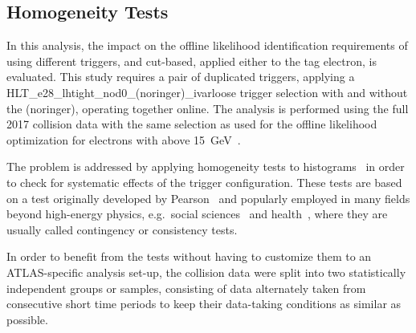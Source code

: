 \FloatBarrier
\subsection[Homogeneity Tests]{Homogeneity Tests}\label{ssec:agreement}

In this analysis, the impact on the offline likelihood identification requirements of using different triggers, \rnn{} and cut-based, applied either to the tag electron, is evaluated. 
This study requires a pair of duplicated triggers, applying a HLT\_e28\_lhtight\_nod0\_(noringer)\_ivarloose trigger selection with and without the \rnn{} (noringer), operating together online. The analysis is performed using the full 2017 collision data with the same selection as used for the offline likelihood optimization for electrons with \ET above \SI{15}{\GeV}~\cite{PERF-2017-01}.













The problem is addressed by applying homogeneity tests to histograms~\cite{homogeneity_test} in order to check for systematic effects of the trigger configuration. These tests are based on a test originally developed by Pearson~\cite{pearson1911probability} and popularly employed in many fields beyond high-energy physics, e.g.\ social sciences~\cite{wickens2014multiway} and health~\cite{ma2015homogeneity}, where they are usually called contingency or consistency tests.

In order to benefit from the tests without having to customize them to an ATLAS-specific analysis set-up, the collision data were split into two
statistically independent groups or samples, consisting of data alternately taken from consecutive short time periods to keep their data-taking conditions as
similar as possible. 

